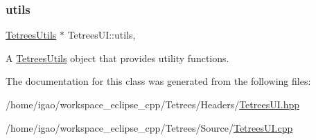 \subsubsection{\texorpdfstring{utils}{utils}}
{\footnotesize\ttfamily \hyperlink{classTetreesUtils}{Tetrees\+Utils} $\ast$ Tetrees\+U\+I\+::utils\hspace{0.3cm}{\ttfamily [static]}, {\ttfamily [private]}}

A \hyperlink{classTetreesUtils}{Tetrees\+Utils} object that provides utility functions. 

The documentation for this class was generated from the following files\+:\begin{DoxyCompactItemize}
\item 
/home/igao/workspace\+\_\+eclipse\+\_\+cpp/\+Tetrees/\+Headers/\hyperlink{TetreesUI_8hpp}{Tetrees\+U\+I.\+hpp}\item 
/home/igao/workspace\+\_\+eclipse\+\_\+cpp/\+Tetrees/\+Source/\hyperlink{TetreesUI_8cpp}{Tetrees\+U\+I.\+cpp}\end{DoxyCompactItemize}
